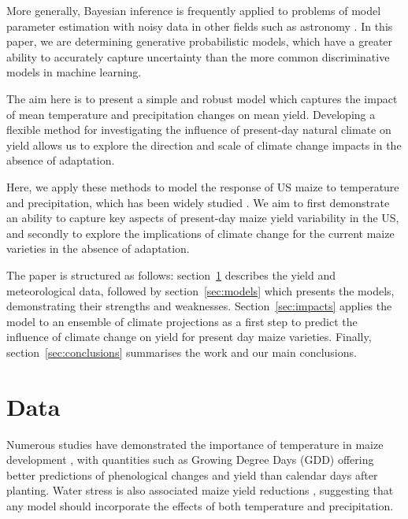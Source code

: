 \documentclass[12pt]{iopart}
\newcommand{\remove}[1]{}
\newcommand{\add}[1]{#1}
\begin{document}
More generally, Bayesian inference is frequently applied to problems of model parameter estimation with noisy data in other fields such as astronomy \citep{Hurley:2016}. In this paper, we are determining generative probabilistic models, which have a greater ability to accurately capture uncertainty than the more common discriminative models in machine learning.  


The aim here is to present a simple and robust model which captures the impact of mean temperature and precipitation changes on mean yield. Developing a flexible method for investigating the influence of present-day natural climate on yield allows us to explore the direction and scale of climate change impacts in the absence of adaptation.


Here, we apply these methods to model the response of US maize to temperature and precipitation, which has been widely studied \citep[e.g.][]{schlenker:2009, hatfield:2011, roberts:2012, lobell:2013, sanchez:2014, hatfield:2015, Partridge:2019}. We aim to first demonstrate an ability to capture key aspects of present-day maize yield variability in the US, and secondly to explore the implications of climate change for the current maize varieties in the absence of adaptation. 


The paper is structured as follows: section~\ref{sec:data} describes the yield and meteorological data, followed by section~\ref{sec:models} which presents the models, demonstrating their strengths and weaknesses. Section~\ref{sec:impacts} applies the model \remove{with increments in temperature and precipitation}\add{to an ensemble of climate projections} as a first step to predict the \remove{consequence}\add{influence} of climate change on \remove{agricultural}yield \add{for present day maize varieties}. Finally, section~\ref{sec:conclusions} summarises the work and our main conclusions.



\section{Data}
\label{sec:data}

\add{Numerous studies have demonstrated the importance of temperature in maize development \citep[e.g.][]{cross:1972, coelho:1980, daughtry:1984, cutforth:1990, bonhomme:1994}, with quantities such as Growing Degree Days (GDD) offering better predictions of phenological changes and yield than calendar days after planting. Water stress is also associated maize yield reductions \citep[e.g.][and references therein]{cakir:2004, ge:2012, lobell:2013, carter:2016, song:2019}, suggesting that any model should incorporate the effects of both temperature and precipitation.}
\end{document}
